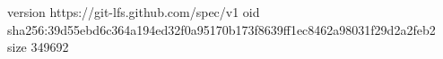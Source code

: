 version https://git-lfs.github.com/spec/v1
oid sha256:39d55ebd6c364a194ed32f0a95170b173f8639ff1ec8462a98031f29d2a2feb2
size 349692
